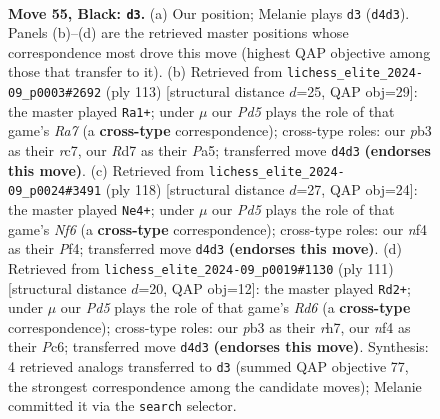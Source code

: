 \documentclass[11pt]{article}
\begin{document}
\clearpage

\begin{figure}[p]\centering
\begin{subfigure}{0.46\textwidth}\centering
\resizebox{\linewidth}{!}{%
\newchessgame
\chessboard[
  setfen={5k2/3r1p2/7r/p7/3p1N2/1P3K2/R6P/2R5 b - - 5 55},
  showmover=false,
  pgfstyle=straightmove, color=movearrow, markmove={d4-d3}
]}
\caption{}
\end{subfigure}\hfill
\begin{subfigure}{0.46\textwidth}\centering
\resizebox{\linewidth}{!}{%
\newchessgame
\chessboard[
  setfen={3r2k1/2R5/1R6/p4Pp1/3P4/4P3/rp6/6K1 b - - 0 57},
  showmover=false,
  pgfstyle=straightmove, color=movearrow, markmove={a2-a1}
]}
\caption{}
\end{subfigure}
\\[4pt]
\begin{subfigure}{0.46\textwidth}\centering
\resizebox{\linewidth}{!}{%
\newchessgame
\chessboard[
  setfen={8/8/3kpN2/8/3P1P2/1P2R1P1/6K1/1r6 w - - 5 60},
  showmover=false,
  pgfstyle=straightmove, color=movearrow, markmove={f6-e4}
]}
\caption{}
\end{subfigure}\hfill
\begin{subfigure}{0.46\textwidth}\centering
\resizebox{\linewidth}{!}{%
\newchessgame
\chessboard[
  setfen={5k2/7R/r1p5/P3RpP1/8/2pr4/5K2/8 b - - 0 56},
  showmover=false,
  pgfstyle=straightmove, color=movearrow, markmove={d3-d2}
]}
\caption{}
\end{subfigure}
\caption{\textbf{Move 55, Black: \texttt{d3}.} (a) Our position; Melanie plays \texttt{d3} (\texttt{d4d3}). Panels (b)--(d) are the retrieved master positions whose correspondence most drove this move (highest QAP objective among those that transfer to it). (b) Retrieved from \texttt{lichess\_elite\_2024-09\_p0003\#2692} (ply 113) [structural distance $d$=25, QAP obj=29]: the master played \texttt{Ra1+}; under $\mu$ our \emph{Pd5} plays the role of that game's \emph{Ra7} (a \textbf{cross-type} correspondence); cross-type roles: our \emph{p}b3 as their \emph{r}c7, our \emph{R}d7 as their \emph{P}a5; transferred move \texttt{d4d3} \textbf{(endorses this move)}. (c) Retrieved from \texttt{lichess\_elite\_2024-09\_p0024\#3491} (ply 118) [structural distance $d$=27, QAP obj=24]: the master played \texttt{Ne4+}; under $\mu$ our \emph{Pd5} plays the role of that game's \emph{Nf6} (a \textbf{cross-type} correspondence); cross-type roles: our \emph{n}f4 as their \emph{P}f4; transferred move \texttt{d4d3} \textbf{(endorses this move)}. (d) Retrieved from \texttt{lichess\_elite\_2024-09\_p0019\#1130} (ply 111) [structural distance $d$=20, QAP obj=12]: the master played \texttt{Rd2+}; under $\mu$ our \emph{Pd5} plays the role of that game's \emph{Rd6} (a \textbf{cross-type} correspondence); cross-type roles: our \emph{p}b3 as their \emph{r}h7, our \emph{n}f4 as their \emph{P}c6; transferred move \texttt{d4d3} \textbf{(endorses this move)}. Synthesis: 4 retrieved analogs transferred to \texttt{d3} (summed QAP objective 77, the strongest correspondence among the candidate moves); Melanie committed it via the \texttt{search} selector.}
\label{fig:thought-m109}
\end{figure}
\end{document}
